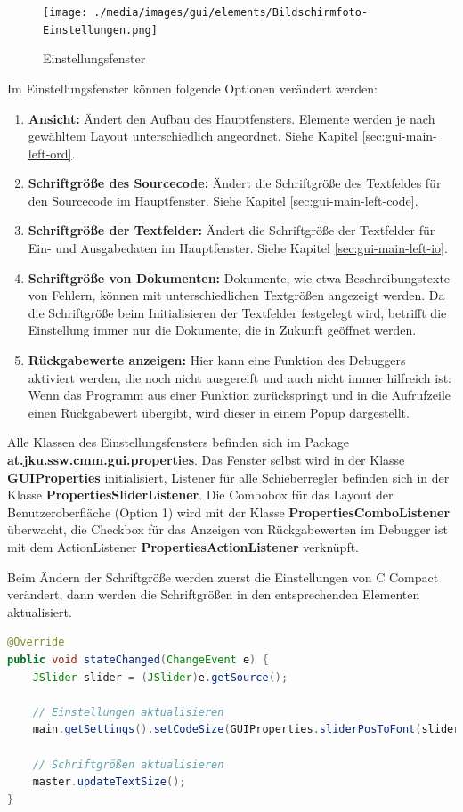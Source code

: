 \begin{figure}[htp]
\centering
\texttt{[image: ./media/images/gui/elements/Bildschirmfoto-Einstellungen.png]}
\caption{Einstellungsfenster}
\label{fig:win-set}
\end{figure}

Im Einstellungsfenster können folgende Optionen verändert werden:
\begin{enumerate}
\item \textbf{Ansicht:} Ändert den Aufbau des Hauptfensters. Elemente werden je nach gewähltem Layout unterschiedlich angeordnet. Siehe Kapitel \ref{sec:gui-main-left-ord}.
\item \textbf{Schriftgröße des Sourcecode:} Ändert die Schriftgröße des Textfeldes für den Sourcecode im Hauptfenster. Siehe Kapitel \ref{sec:gui-main-left-code}.
\item \textbf{Schriftgröße der Textfelder:} Ändert die Schriftgröße der Textfelder für Ein- und Ausgabedaten im Hauptfenster. Siehe Kapitel \ref{sec:gui-main-left-io}.
\item \textbf{Schriftgröße von Dokumenten:} Dokumente, wie etwa Beschreibungstexte von Fehlern, können mit unterschiedlichen Textgrößen angezeigt werden. Da die Schriftgröße beim Initialisieren der Textfelder festgelegt wird, betrifft die Einstellung immer nur die Dokumente, die in Zukunft geöffnet werden.
\item \textbf{Rückgabewerte anzeigen:} Hier kann eine Funktion des Debuggers aktiviert werden, die noch nicht ausgereift und auch nicht immer hilfreich ist: Wenn das Programm aus einer Funktion zurückspringt und in die Aufrufzeile einen Rückgabewert übergibt, wird dieser in einem Popup dargestellt.
\end{enumerate}

Alle Klassen des Einstellungsfensters befinden sich im Package \textbf{at.jku.ssw.cmm.gui.properties}. Das Fenster selbst wird in der Klasse \textbf{GUIProperties} initialisiert, Listener für alle Schieberregler befinden sich in der Klasse \textbf{PropertiesSliderListener}. Die Combobox für das Layout der Benutzeroberfläche (Option 1) wird mit der Klasse \textbf{PropertiesComboListener} überwacht, die Checkbox für das Anzeigen von Rückgabewerten im Debugger ist mit dem ActionListener \textbf{PropertiesActionListener} verknüpft.

Beim Ändern der Schriftgröße werden zuerst die Einstellungen von C Compact verändert, dann werden die Schriftgrößen in den entsprechenden Elementen aktualisiert.
\begin{lstlisting}[language=JAVA]
@Override
public void stateChanged(ChangeEvent e) {
	JSlider slider = (JSlider)e.getSource();
	
	// Einstellungen aktualisieren
	main.getSettings().setCodeSize(GUIProperties.sliderPosToFont(slider.getValue()));
	
	// Schriftgrößen aktualisieren
	master.updateTextSize();
}
\end{lstlisting}


